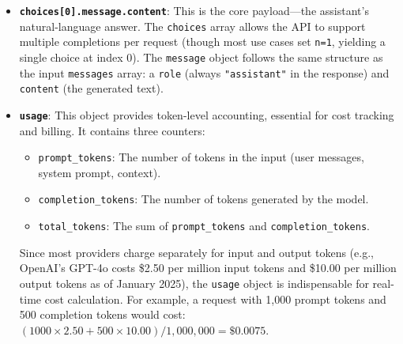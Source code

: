 \documentclass[english]{article}
\begin{document}
\begin{itemize}
    \item \textbf{\texttt{choices[0].message.content}}: This is the core payload—the assistant's natural-language answer. The \texttt{choices} array allows the API to support multiple completions per request (though most use cases set \texttt{n=1}, yielding a single choice at index 0). The \texttt{message} object follows the same structure as the input \texttt{messages} array: a \texttt{role} (always \texttt{"assistant"} in the response) and \texttt{content} (the generated text).

    \item \textbf{\texttt{usage}}: This object provides token-level accounting, essential for cost tracking and billing. It contains three counters:
    \begin{itemize}
        \item \texttt{prompt\_tokens}: The number of tokens in the input (user messages, system prompt, context).
        \item \texttt{completion\_tokens}: The number of tokens generated by the model.
        \item \texttt{total\_tokens}: The sum of \texttt{prompt\_tokens} and \texttt{completion\_tokens}.
    \end{itemize}
    Since most providers charge separately for input and output tokens (e.g., OpenAI's GPT-4o costs \$2.50 per million input tokens and \$10.00 per million output tokens as of January 2025), the \texttt{usage} object is indispensable for real-time cost calculation. For example, a request with 1,000 prompt tokens and 500 completion tokens would cost: $(1000 \times 2.50 + 500 \times 10.00) / 1{,}000{,}000 = \$0.0075$.


\end{itemize}
\end{document}
